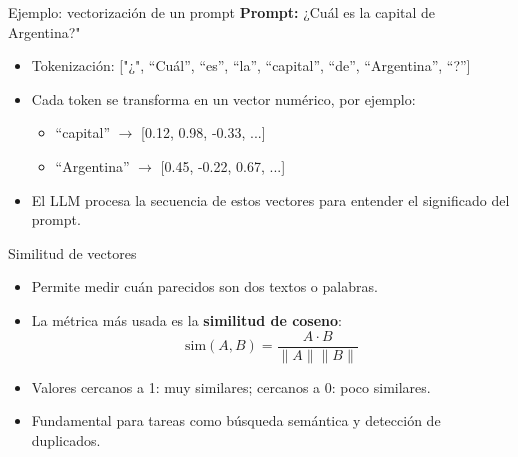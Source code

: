 \documentclass[aspectratio=169,xcolor=dvipsnames, t]{beamer}
\begin{document}

\begin{frame}{Ejemplo: vectorización de un prompt}
    \textbf{Prompt:} ¿Cuál es la capital de Argentina?"
    \begin{itemize}
        \item Tokenización: ["¿", ``Cuál'', ``es'', ``la'', ``capital'', ``de'', ``Argentina'', ``?'']
        \item Cada token se transforma en un vector numérico, por ejemplo:
        \begin{itemize}
            \item ``capital'' $\rightarrow$ [0.12, 0.98, -0.33, ...]
            \item ``Argentina'' $\rightarrow$ [0.45, -0.22, 0.67, ...]
        \end{itemize}
        \item El LLM procesa la secuencia de estos vectores para entender el significado del prompt.
    \end{itemize}
\end{frame}

\begin{frame}{Similitud de vectores}
    \begin{itemize}
        \item Permite medir cuán parecidos son dos textos o palabras.
        \item La métrica más usada es la \textbf{similitud de coseno}:
        \[
        \text{sim}(A, B) = \frac{A \cdot B}{\|A\| \|B\|}
        \]
        \item Valores cercanos a 1: muy similares; cercanos a 0: poco similares.
        \item Fundamental para tareas como búsqueda semántica y detección de duplicados.
    \end{itemize}
    \vspace{0.3cm}
    
\end{frame}

    
\end{document}
